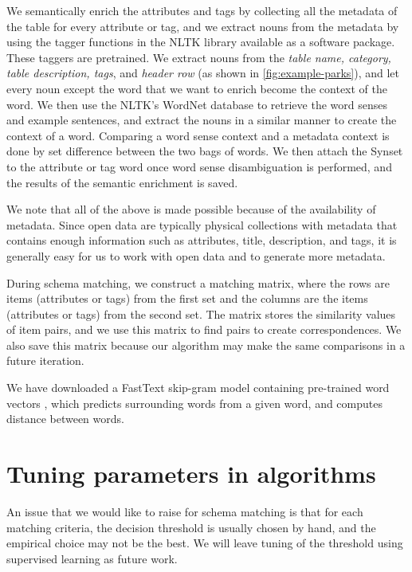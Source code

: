 We semantically enrich the attributes and tags by collecting all the metadata of the table for every attribute or tag, and we extract nouns from the metadata by using the tagger functions in the NLTK library \cite{loper-bird-2002-nltk} available as a software package. These taggers are pretrained. We extract nouns from the \textit{table name, category, table description, tags}, and \textit{header row} (as shown in \autoref{fig:example-parks}), and let every noun except the word that we want to enrich become the context of the word. We then use the NLTK's WordNet database to retrieve the word senses and example sentences, and extract the nouns in a similar manner to create the context of a word. Comparing a word sense context and a metadata context is done by set difference between the two bags of words. We then attach the Synset to the attribute or tag word once word sense disambiguation is performed, and the results of the semantic enrichment is saved.

We note that all of the above is made possible because of the availability of metadata. Since open data are typically physical collections with metadata that contains enough information \cite{Rahm2016Case} such as attributes, title, description, and tags, it is generally easy for us to work with open data and to generate more metadata.

During schema matching, we construct a matching matrix, where the rows are items (attributes or tags) from the first set and the columns are the items (attributes or tags) from the second set. The matrix stores the similarity values of item pairs, and we use this matrix to find pairs to create correspondences. We also save this matrix because our algorithm may make the same comparisons in a future iteration.

We have downloaded a FastText skip-gram model containing pre-trained word vectors \cite{mikolov-etal-2018-advances}, which predicts surrounding words from a given word, and computes distance between words.

\section{Tuning parameters in algorithms}
\label{sec:TuningParametersInAlgorithms}

An issue that we would like to raise for schema matching is that for each matching criteria, the decision threshold is usually chosen by hand, and the empirical choice may not be the best. We will leave tuning of the threshold using supervised learning as future work.

